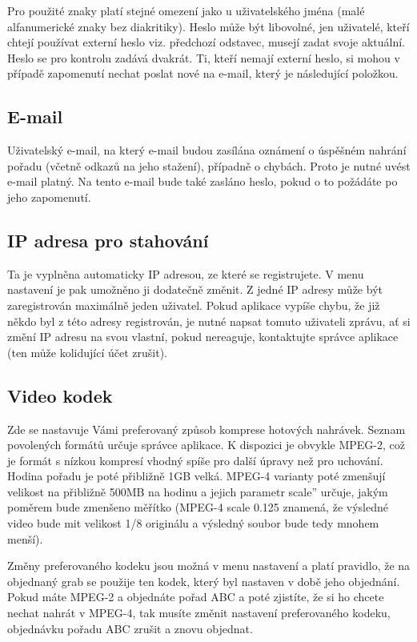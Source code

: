 Pro použité znaky platí stejné omezení jako u uživatelského jména (malé alfanumerické znaky bez diakritiky). Heslo může být libovolné, jen uživatelé, kteří chtejí používat externí heslo viz. předchozí odstavec, musejí zadat svoje aktuální. Heslo se pro kontrolu zadává dvakrát. Ti, kteří nemají externí heslo, si mohou v případě zapomenutí nechat poslat nové na e-mail, který je následující položkou.

\subsection{E-mail}

Uživatelský e-mail, na který e-mail budou zasílána oznámení o úspěšném nahrání pořadu (včetně odkazů na jeho stažení), případně o chybách. Proto je nutné uvést e-mail platný. Na tento e-mail bude také zasláno heslo, pokud o to požádáte po jeho zapomenutí.
\vfil
\pagebreak
\subsection{IP adresa pro stahování}

Ta je vyplněna automaticky IP adresou, ze které se registrujete. V menu nastavení je pak umožněno ji dodatečně změnit. Z jedné IP adresy může být zaregistrován maximálně jeden uživatel. Pokud aplikace vypíše chybu, že již někdo byl z této adresy registrován, je nutné napsat tomuto uživateli zprávu, ať si změní IP adresu na svou vlastní, pokud nereaguje, kontaktujte správce aplikace (ten může kolidující účet zrušit).

\subsection{Video kodek}

Zde se nastavuje Vámi preferovaný způsob komprese hotových nahrávek. Seznam povolených formátů určuje správce aplikace. K dispozici je obvykle MPEG-2, což je formát s nízkou kompresí vhodný spíše pro další úpravy než pro uchování. Hodina pořadu je poté přibližně 1GB velká. MPEG-4 varianty poté zmenšují velikost na přibližně 500MB na hodinu a jejich parametr \quotedblbase scale'' určuje, jakým poměrem bude zmenšeno měřítko (MPEG-4 scale 0.125 znamená, že výsledné video bude mit velikost 1/8 originálu a výsledný soubor bude tedy mnohem menší).

Změny preferovaného kodeku jsou možná v menu nastavení a platí pravidlo, že na objednaný grab se použije ten kodek, který byl nastaven v době jeho objednání. Pokud máte MPEG-2 a objednáte pořad ABC a poté zjistíte, že si ho chcete nechat nahrát v MPEG-4, tak musíte změnit nastavení preferovaného kodeku, objednávku pořadu ABC zrušit a znovu objednat.

